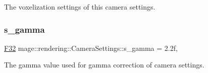 The voxelization settings of this camera settings. \mbox{\label{classmage_1_1rendering_1_1_camera_settings_add0c4a63661e6cbfed40f6f3267d72d5}} 
\subsubsection{\texorpdfstring{s\+\_\+gamma}{s\_gamma}}
{\footnotesize\ttfamily \mbox{\hyperlink{namespacemage_aa97e833b45f06d60a0a9c4fc22ae02c0}{F32}} mage\+::rendering\+::\+Camera\+Settings\+::s\+\_\+gamma = 2.\+2f\hspace{0.3cm}{\ttfamily [static]}, {\ttfamily [private]}}

The gamma value used for gamma correction of camera settings. 